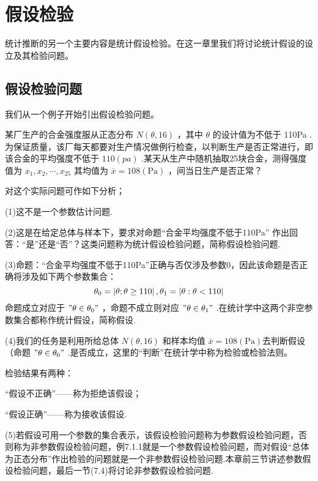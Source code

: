 \chapter{假设检验}
统计推断的另一个主要内容是统计假设检验。在这一章里我们将讨论统计假设的设立及其检验问题。

\section{假设检验问题}
我们从一个例子开始引出假设检验问题。
\begin{problem}
某厂生产的合金强度服从正态分布 $N(\theta,16)$ ，其中 $\theta$ 的设计值为不低于 110Pa .为保证质量，该厂每天都要对生产情况做例行检查，以判断生产是否正常进行，即该合金的平均强度不低于 $110(pa)$ .某天从生产中随机抽取25块合金，测得强度值为 $x_{1},x_{2},\cdots,x_{25}$ 其均值为 $\overline{x}=108(\mathrm {Pa})$ ，间当日生产是否正常？

对这个实际问题可作如下分析；

(1)这不是一个参数估计问题.

(2)这是在给定总体与样本下，要求对命题“合金平均强度不低于110Pa”
作出回答：“是”还是“否”？这类问题称为统计假设检验问题，简称假设检验问题.

(3)命题：“合金平均强度不低于110Pa”正确与否仅涉及参数0，因此该命题是否正确将涉及如下两个参数集合：
\[
\theta_0=\left|\theta ;\theta\geq 110\right|,\\\theta_1=\left|\theta :\theta <110\right|
\]
命题成立对应于 $"\theta\in\theta_0"$ ，命题不成立则对应 $"\theta\in\theta_1"$ .在统计学中这两个非空参数集合都称作统计假设，简称假设.

(4)我们的任务是利用所给总体 $N(\theta,16)$ 和样本均值 $\overline{x}=108(\mathrm {Pa})$去判断假设（命题 $"\theta\in\theta_0"$ .是否成立，这里的“判断”在统计学中称为检验或检验法则。

检验结果有两种：
\begin{center}
	“假设不正确”——称为拒绝该假设；
	
	“假设正确”——称为接收该假设.
\end{center}

(5)若假设可用一个参数的集合表示，该假设检验问题称为参数假设检验问题，否则称为非参数假设检验问题，例7.1.1就是一个参数假设检验问题，而对假设“总体为正态分布”作出检验的问题就是一个非参数假设检验问题.本章前三节讲述参数假设检验问题，最后一节(7.4)将讨论非参数假设检验问题.
\end{problem}

